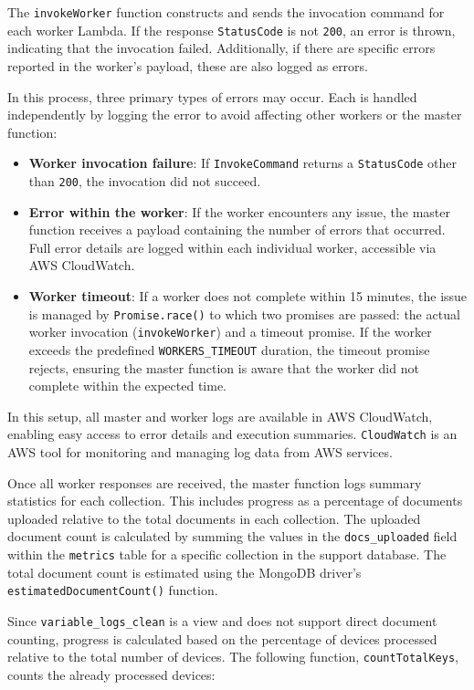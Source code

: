 The \texttt{invokeWorker} function constructs and sends the invocation command for each worker Lambda. If the response \texttt{StatusCode} is not \texttt{200}, an error is thrown, indicating that the invocation failed. Additionally, if there are specific errors reported in the worker's payload, these are also logged as errors.

In this process, three primary types of errors may occur. Each is handled independently by logging the error to avoid affecting other workers or the master function:
\begin{itemize}
    \item \textbf{Worker invocation failure}: If \texttt{InvokeCommand} returns a \texttt{StatusCode} other than \texttt{200}, the invocation did not succeed.
    \item \textbf{Error within the worker}: If the worker encounters any issue, the master function receives a payload containing the number of errors that occurred. Full error details are logged within each individual worker, accessible via \ac{AWS} CloudWatch.
    \item \textbf{Worker timeout}: If a worker does not complete within 15 minutes, the issue is managed by \texttt{Promise.race()} to which two promises are passed: the actual worker invocation (\texttt{invokeWorker}) and a timeout promise. If the worker exceeds the predefined \texttt{WORKERS\_TIMEOUT} duration, the timeout promise rejects, ensuring the master function is aware that the worker did not complete within the expected time.
\end{itemize}

In this setup, all master and worker logs are available in \ac{AWS} CloudWatch, enabling easy access to error details and execution summaries. \texttt{CloudWatch} is an \ac{AWS} tool for monitoring and managing log data from \ac{AWS} services. 

Once all worker responses are received, the master function logs summary statistics for each collection. This includes progress as a percentage of documents uploaded relative to the total documents in each collection. The uploaded document count is calculated by summing the values in the \texttt{docs\_uploaded} field within the \texttt{metrics} table for a specific collection in the support database. The total document count is estimated using the MongoDB driver's \\ \texttt{estimatedDocumentCount()} function.

Since \texttt{variable\_logs\_clean} is a view and does not support direct document counting, progress is calculated based on the percentage of devices processed relative to the total number of devices. The following function, \texttt{countTotalKeys}, counts the already processed devices:

